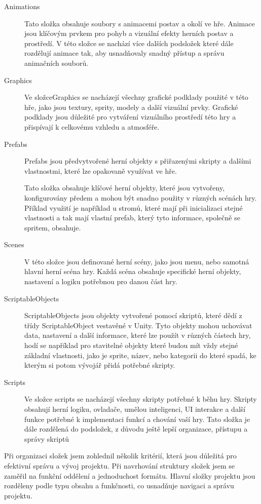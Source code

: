 
\begin{description}
	\item[Animations] Tato složka obsahuje soubory s animacemi postav a okolí ve hře. Animace jsou klíčovým prvkem pro pohyb a vizuální efekty herních postav a prostředí. V této složce se nachází více dalších podsložek které dále rozdělují animace tak, aby usnadňovaly snadný přístup a správu animačních souborů.
	\item[Graphics] Ve složceGraphics se nacházejí všechny grafické podklady použité v této hře, jako jsou textury, sprity, modely a další vizuální prvky. Grafické podklady jsou důležité pro vytváření vizuálního prostředí této hry a přispívají k celkovému vzhledu a atmosféře.
	\item[Prefabs] Prefabs jsou předvytvořené herní objekty s přiřazenými skripty a dalšími vlastnostmi, které lze opakovaně využívat ve hře.
	
	Tato složka obsahuje klíčové herní objekty, které jsou vytvořeny, konfigurovány předem a mohou být snadno použity v různých scénách hry. Příklad využití je například u stromů, které mají při inicializaci stejné vlastnosti a tak mají vlastní prefab, který tyto informace, společně se spritem, obsahuje.
	\item[Scenes] V této složce jsou definované herní scény, jako jsou menu, nebo samotná hlavní herní scéna hry. Každá scéna obsahuje specifické herní objekty, nastavení a logiku potřebnou pro danou část hry.
	\item[ScriptableObjects] ScriptableObjects jsou objekty vytvořené pomocí skriptů, které dědí z třídy ScriptableObject vestavěné v Unity. Tyto objekty mohou uchovávat data, nastavení a další informace, které lze použít v různých částech hry, hodí se například pro stavitelné objekty které budou mít vždy stejné základní vlastnosti, jako je sprite, název, nebo kategorii do které spadá, ke kterým si potom vývojář přidá potřebné skripty.
	\item[Scripts] Ve složce scripts se nacházejí všechny skripty potřebné k běhu hry. Skripty obsahují herní logiku, ovladače, umělou inteligenci, UI interakce a další funkce potřebné k implementaci funkcí a chování vaší hry. Tato složka je dále rozdělená do podsložek, z důvodu ještě lepší organizace, přístupu a správy skriptů
\end{description}

Při organizaci složek jsem zohlednil několik kritérií, která jsou důležitá pro efektivní správu a vývoj projektu. Při navrhování struktury složek jsem se zaměřil na funkční oddělení a jednoduchost formátu. Hlavní složky projektu jsou rozděleny podle typu obsahu a funkčnosti, co usnadňuje navigaci a správu projektu.

